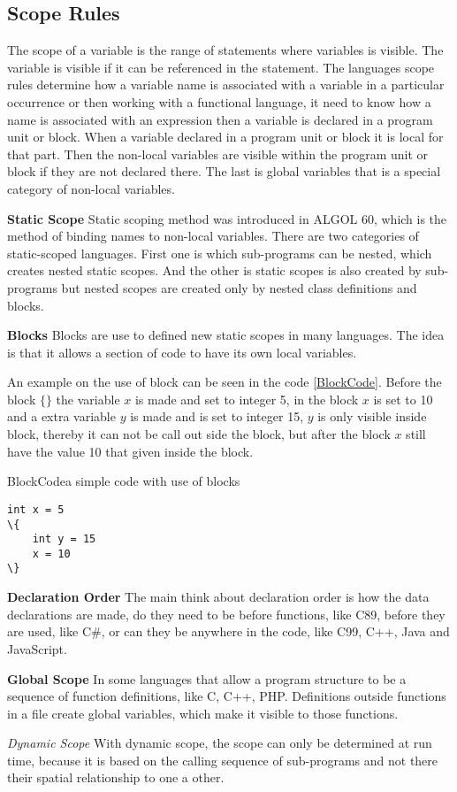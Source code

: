 \subsection{Scope Rules}
The scope of a variable is the range of statements where variables is visible. The variable is visible if it can be referenced in the statement.
The languages scope rules determine how a variable name is associated with a variable in a particular occurrence or then working with a functional language, it need to know how a name is associated with an expression then a variable is declared in a program unit or block. When a variable declared in a program unit or block it is local for that part. Then the non-local variables are visible within the program unit or block if they are not declared there. The last is global variables that is a special category of non-local variables.

\textbf{Static Scope}
Static scoping method was introduced in ALGOL 60, which is the method of binding names to non-local variables. There are two categories of static-scoped languages. First one is which sub-programs can be nested, which creates nested static scopes. And the other is static scopes is also created by sub-programs but nested scopes are created only by nested class definitions and blocks.

\textbf{Blocks}
Blocks are use to defined new static scopes in many languages. The idea is that it allows a section of code to have its own local variables.

An example on the use of block can be seen in the code \ref{BlockCode}. Before the block $\{ \}$ the variable $x$ is made and set to integer 5, in the block $x$ is set to 10 and a extra variable $y$ is made and is set to integer 15, $y$ is only visible inside block, thereby it can not be call out side the block, but after the block $x$ still have the value 10 that given inside the block.

\begin{code}{BlockCode}{a simple code with use of blocks}
\begin{lstlisting}
int x = 5
\{
    int y = 15
    x = 10
\} 
\end{lstlisting}
\end{code}

\textbf{Declaration Order}
The main think about declaration order is how the data declarations are made, do they need to be before functions, like C89, before they are used, like C#, or can they be anywhere in the code, like C99, C++, Java and JavaScript.

\textbf{Global Scope}
In some languages that allow a program structure to be a sequence of function definitions, like C, C++, PHP. Definitions outside functions in a file create global variables, which make it  visible to those functions.

\textit{Dynamic Scope}
With dynamic scope, the scope can only be determined at run time, because it is based on the calling sequence of sub-programs and not there their spatial relationship to one a other.
